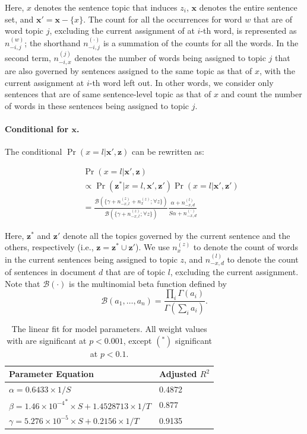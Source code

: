 Here, $x$ denotes the sentence topic that induces $z_i$, $\mathbf{x}$ denotes
the entire sentence set, and $\mathbf{x}' = \mathbf{x} - \{ x \}$.  The count
{for} all the occurrences for word $w$ that are of word topic $j$, excluding
the current assignment of at $i$-th word, is represented as $n_{-i,j}^{(w)}$;
the shorthand $n_{-i,j}^{(\cdot)}$ is a summation of the counts for all the
words.  In the second term, $n_{-i,x}^{(j)}$ denotes the number of words being
assigned to topic $j$ that are also governed by sentences assigned to the same
topic as that of $x$, with the current assignment at $i$-th word left out.  In
other words, we consider only sentences that are of same sentence-level topic
as that of $x$ and count the number of words in these sentences being assigned
to topic $j$.  

\paragraph{Conditional for $\mathbf{x}$.}  The conditional $\Pr(x =
l|\mathbf{x}',\mathbf{z})$ can be rewritten as: 

\begin{eqnarray*}
  && \Pr(x = l|\mathbf{x}',\mathbf{z}) \nonumber\\
  && \propto \Pr(\mathbf{z}^*|x = l, \mathbf{x}', \mathbf{z}') \Pr(x = l |\mathbf{x}',\mathbf{z}') \\
  && = \frac{\mathcal{B}(\{\gamma + n_{-x,l}^{(z)} + n_x^{(z)}; \forall z\})}{\mathcal{B}(\{\gamma + n_{-x,l}^{(z)}; \forall z\})}
  \frac{\alpha + n_{-x,d}^{(l)}}{S \alpha + n_{-x,d}^{(\cdot)}}
\end{eqnarray*}

Here, $\mathbf{z}^*$ and $\mathbf{z}'$ denote all the topics governed by the
current sentence and the others, respectively (i.e., $\mathbf{z} = \mathbf{z}^*
\cup \mathbf{z}'$).  We use $n_x^{(z)}$ to denote the count of words in the
current sentences being assigned to topic $z$, and $n_{-x,d}^{(l)}$ to denote
the count of sentences in document $d$ that are of topic $l$, excluding the
current assignment.  Note that $\mathcal{B}(\cdot)$ is the multinomial beta
function defined by \[\mathcal{B}(a_1, \ldots, a_n) = \frac{\prod_i
\Gamma(a_i)}{\Gamma(\sum_i a_i)}. \]

\begin{table}[!ht]
  \centering
  \begin{tabular}{ll}
    Parameter Equation &  Adjusted $R^2$ \\
    \hline
    $\alpha = 0.6433 \times 1/S$ & 0.4872 \\
    $\beta = 1.46 \times {10^{-4}}^{*} \times S + 1.4528713 \times 1/T$ & 0.877 \\
    $\gamma = 5.276 \times {10^{-5}} \times S + 0.2156 \times 1/T $& 0.9135 
  \end{tabular}

  \caption{The linear fit for model parameters.  All weight values with are
  significant at $p < 0.001$, except $(^*)$
  significant at $p < 0.1$.}\label{t:model-parameters} \end{table}

